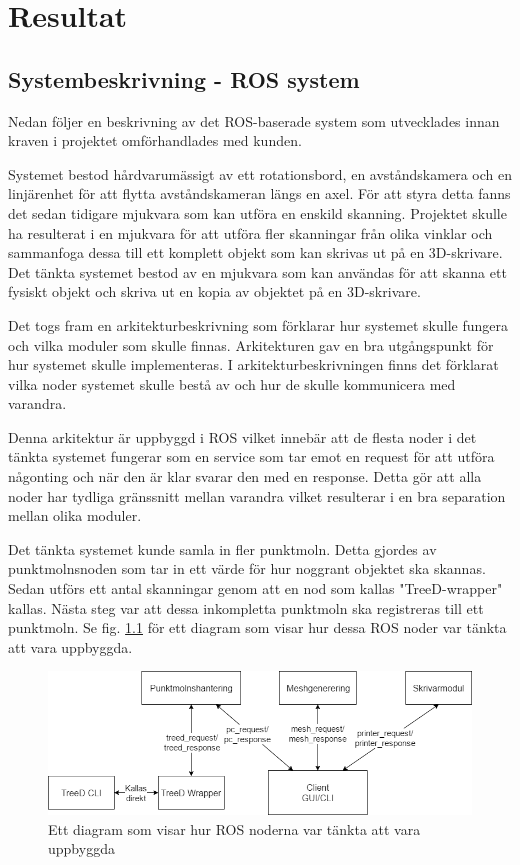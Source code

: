 \chapter{Resultat}
\label{cha:results}

\section{Systembeskrivning - ROS system}

Nedan följer en beskrivning av det ROS-baserade system som utvecklades innan kraven i projektet omförhandlades med kunden.
  
Systemet bestod hårdvarumässigt av ett rotationsbord, en avståndskamera och en linjärenhet för att flytta avståndskameran längs en axel. För att styra detta fanns det sedan tidigare mjukvara som kan utföra en enskild skanning. Projektet skulle ha resulterat i en mjukvara för att utföra fler skanningar från olika vinklar och sammanfoga dessa till ett komplett objekt som kan skrivas ut på en 3D-skrivare. Det tänkta systemet bestod av en mjukvara som kan användas för att skanna ett fysiskt objekt och skriva ut en kopia av objektet på en 3D-skrivare.


Det togs fram en arkitekturbeskrivning som förklarar hur systemet skulle fungera och vilka moduler som skulle finnas. Arkitekturen gav en bra utgångspunkt för hur systemet skulle implementeras. I arkitekturbeskrivningen finns det förklarat vilka noder systemet skulle bestå av och hur de skulle kommunicera med varandra.

Denna arkitektur är uppbyggd i ROS vilket innebär att de flesta noder i det tänkta systemet fungerar som en service som tar emot en request för att utföra någonting och när den är klar svarar den med en response. Detta gör att alla noder har tydliga gränssnitt mellan varandra vilket resulterar i en bra separation mellan olika moduler.

Det tänkta systemet kunde samla in fler punktmoln. Detta gjordes av punktmolnsnoden som tar in ett värde för hur noggrant objektet ska skannas. Sedan utförs ett antal skanningar genom att en nod som kallas "TreeD-wrapper" kallas. Nästa steg var att dessa inkompletta punktmoln ska registreras till ett punktmoln. Se fig. \ref{fig:noddiagram} för ett diagram som visar hur dessa ROS noder var tänkta att vara uppbyggda.

\begin{figure}[H]
	\centering
	\includegraphics[width=130mm]{figures/Noddiagram.png}
	\caption{Ett diagram som visar hur ROS noderna var tänkta att vara uppbyggda}
	\label{fig:noddiagram}
\end{figure}

